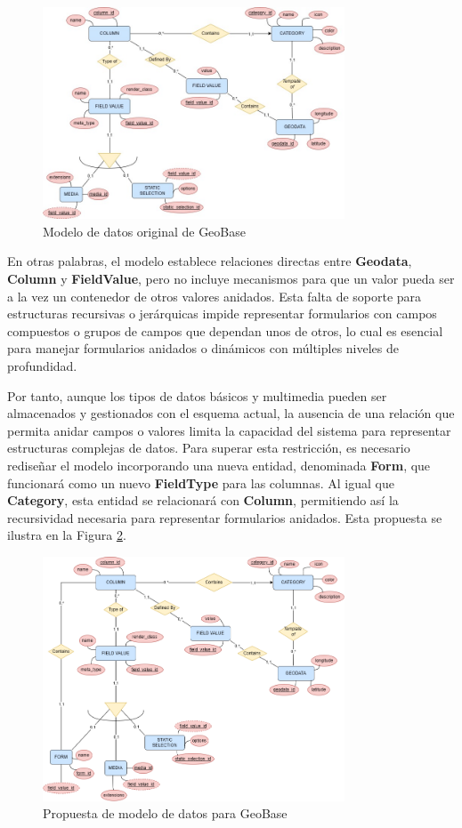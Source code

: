 \documentclass[12pt, a4paper]{book}
\begin{document}
\begin{figure}[H]
\centering
\includegraphics[width=0.8\textwidth]{images/old_merx.jpg}
\caption{Modelo de datos original de GeoBase}
\label{fig:oldmerx}
\end{figure}


En otras palabras, el modelo establece relaciones directas entre \textbf{Geodata}, \textbf{Column} y \textbf{FieldValue}, pero no incluye mecanismos para que un valor pueda ser a la vez un contenedor de otros valores anidados. Esta falta de soporte para estructuras recursivas o jerárquicas impide representar formularios con campos compuestos o grupos de campos que dependan unos de otros, lo cual es esencial para manejar formularios anidados o dinámicos con múltiples niveles de profundidad.

Por tanto, aunque los tipos de datos básicos y multimedia pueden ser almacenados y gestionados con el esquema actual, la ausencia de una relación que permita anidar campos o valores limita la capacidad del sistema para representar estructuras complejas de datos. Para superar esta restricción, es necesario rediseñar el modelo incorporando una nueva entidad, denominada \textbf{Form}, que funcionará como un nuevo \textbf{FieldType} para las columnas. Al igual que \textbf{Category}, esta entidad se relacionará con \textbf{Column}, permitiendo así la recursividad necesaria para representar formularios anidados. Esta propuesta se ilustra en la Figura \ref{fig:newmerx}.

\begin{figure}[H]
\centering
\includegraphics[width=0.8\textwidth]{images/new_merx.png}
\caption{Propuesta de modelo de datos para GeoBase}
\label{fig:newmerx}
\end{figure}
\end{document}
